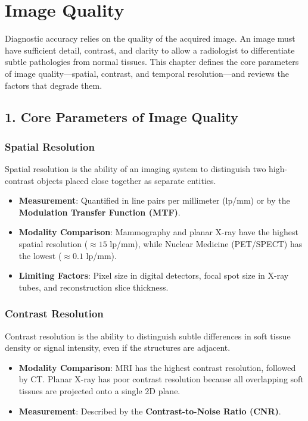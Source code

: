\chapter{Image Quality}

\label{ch:image_quality}

Diagnostic accuracy relies on the quality of the acquired image. An image must have sufficient detail, contrast, and clarity to allow a radiologist to differentiate subtle pathologies from normal tissues. This chapter defines the core parameters of image quality—spatial, contrast, and temporal resolution—and reviews the factors that degrade them.


\section*{1. Core Parameters of Image Quality}

\subsection*{Spatial Resolution}
Spatial resolution is the ability of an imaging system to distinguish two high-contrast objects placed close together as separate entities. 
\begin{itemize}
    \item \textbf{Measurement}: Quantified in line pairs per millimeter (lp/mm) or by the \textbf{Modulation Transfer Function (MTF)}.
    \item \textbf{Modality Comparison}: Mammography and planar X-ray have the highest spatial resolution ($\approx 15$ lp/mm), while Nuclear Medicine (PET/SPECT) has the lowest ($\approx 0.1$ lp/mm).
    \item \textbf{Limiting Factors}: Pixel size in digital detectors, focal spot size in X-ray tubes, and reconstruction slice thickness.
\end{itemize}

\subsection*{Contrast Resolution}
Contrast resolution is the ability to distinguish subtle differences in soft tissue density or signal intensity, even if the structures are adjacent.
\begin{itemize}
    \item \textbf{Modality Comparison}: MRI has the highest contrast resolution, followed by CT. Planar X-ray has poor contrast resolution because all overlapping soft tissues are projected onto a single 2D plane.
    \item \textbf{Measurement}: Described by the \textbf{Contrast-to-Noise Ratio (CNR)}.
\end{itemize}

